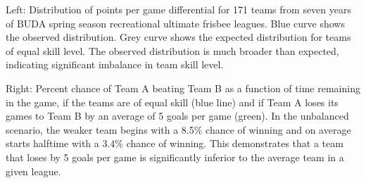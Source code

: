 Left: Distribution of points per game differential for 171 teams from seven years of BUDA spring season recreational ultimate frisbee leagues.  Blue curve shows the observed distribution. Grey curve shows the expected distribution for teams of equal skill level. The observed distribution is much broader than expected, indicating significant imbalance in team skill level. 

Right: Percent chance of Team A beating Team B as a function of time remaining in the game, if the teams are of equal skill (blue line) and if Team A loses its games to Team B by an average of 5 goals per game (green). In the unbalanced scenario, the weaker team begins with a 8.5\% chance of winning and on average starts halftime with a 3.4\% chance of winning. This demonstrates that a team that loses by 5 goals per game is significantly inferior to the average team in a given league. \label{fig:buda_performance}